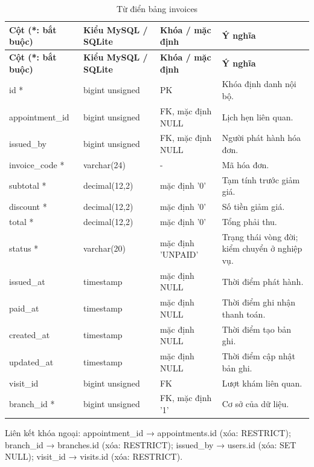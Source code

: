 {\fontsize{10}{12}\selectfont\setlength{\tabcolsep}{3pt}\renewcommand{\arraystretch}{1.12}
\begin{longtable}{@{}L{\textwidth-4.86pt\relax} L{\textwidth-3.96pt\relax} L{\textwidth-2.88pt\relax} L{\textwidth-6.3pt\relax}@{}}
\caption{Từ điển bảng invoices}\\
\toprule
\textbf{Cột (*:\allowbreak{} bắt buộc)} & \textbf{Kiểu My\allowbreak{}SQL /\allowbreak{} SQLite} & \textbf{Khóa /\allowbreak{} mặc định} & \textbf{Ý nghĩa}\\\midrule
\endfirsthead
\toprule
\textbf{Cột (*:\allowbreak{} bắt buộc)} & \textbf{Kiểu My\allowbreak{}SQL /\allowbreak{} SQLite} & \textbf{Khóa /\allowbreak{} mặc định} & \textbf{Ý nghĩa}\\\midrule
\endhead
\bottomrule\endlastfoot
id * & bigint unsigned & PK & Khóa định danh nội bộ.\allowbreak{}\\[1pt]
appointment\_\allowbreak{}id & bigint unsigned & FK, mặc định NULL & Lịch hẹn liên quan.\allowbreak{}\\[1pt]
issued\_\allowbreak{}by & bigint unsigned & FK, mặc định NULL & Người phát hành hóa đơn.\allowbreak{}\\[1pt]
invoice\_\allowbreak{}code * & varchar(24) & - & Mã hóa đơn.\allowbreak{}\\[1pt]
subtotal * & decimal(12,2) & mặc định '0' & Tạm tính trước giảm giá.\allowbreak{}\\[1pt]
discount * & decimal(12,2) & mặc định '0' & Số tiền giảm giá.\allowbreak{}\\[1pt]
total * & decimal(12,2) & mặc định '0' & Tổng phải thu.\allowbreak{}\\[1pt]
status * & varchar(20) & mặc định 'UNPAID' & Trạng thái vòng đời; kiểm chuyển ở nghiệp vụ.\allowbreak{}\\[1pt]
issued\_\allowbreak{}at & timestamp & mặc định NULL & Thời điểm phát hành.\allowbreak{}\\[1pt]
paid\_\allowbreak{}at & timestamp & mặc định NULL & Thời điểm ghi nhận thanh toán.\allowbreak{}\\[1pt]
created\_\allowbreak{}at & timestamp & mặc định NULL & Thời điểm tạo bản ghi.\allowbreak{}\\[1pt]
updated\_\allowbreak{}at & timestamp & mặc định NULL & Thời điểm cập nhật bản ghi.\allowbreak{}\\[1pt]
visit\_\allowbreak{}id & bigint unsigned & FK & Lượt khám liên quan.\allowbreak{}\\[1pt]
branch\_\allowbreak{}id * & bigint unsigned & FK, mặc định '1' & Cơ sở của dữ liệu.\allowbreak{}\\[1pt]
\end{longtable}}
Liên kết khóa ngoại:\allowbreak{} appointment\_\allowbreak{}id → appointments.\allowbreak{}id (xóa:\allowbreak{} RESTRICT); branch\_\allowbreak{}id → branches.\allowbreak{}id (xóa:\allowbreak{} RESTRICT); issued\_\allowbreak{}by → users.\allowbreak{}id (xóa:\allowbreak{} SET NULL); visit\_\allowbreak{}id → visits.\allowbreak{}id (xóa:\allowbreak{} RESTRICT).\allowbreak{}

